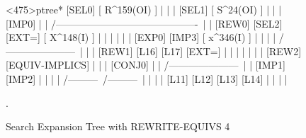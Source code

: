 \begin{figure}
\begin{tpsexample}
<475>ptree*
                                         [SEL0]
                                      [ R^159(OI) ]
                                            |
                                            |
                                            |
                                         [SEL1]
                                      [ S^24(OI) ]
                                            |
                                            |
                                            |
                                         [IMP0]
                                            |
                                            |
                      /-------------------------------------------\
                      |                                           |
                   [REW0]                                      [SEL2]
                   [EXT=]                                   [ X^148(I) ]
                      |                                           |
                      |                                           |
                      |                                           |
                   [EXP0]                                      [IMP3]
                [ x^346(I) ]                                      |
                      |                                           |
                      |                                /---------------------\
                      |                                |                     |
                   [REW1]                            [L16]                 [L17]
                   [EXT=]                              |                     |
                      |                                |                     |
                      |
                      |
                   [REW2]
              [EQUIV-IMPLICS]
                      |
                      |
                      |
                  [CONJ0]
                      |
                      |
           /---------------------\
           |                     |
        [IMP1]                [IMP2]
           |                     |
           |                     |
      /---------\           /---------\
      |         |           |         |
    [L11]     [L12]       [L13]     [L14]
      |         |           |         |

\end{tpsexample}
\caption{Search Expansion Tree with REWRITE-EQUIVS 4}
\label{thm12-search-etree2}.
\end{figure}

